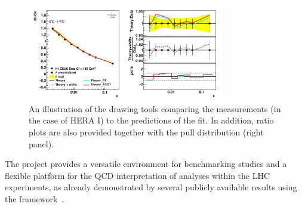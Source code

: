 \begin{description}
\begin{figure}[!ht]
   \centering
   \includegraphics[width=8.6cm]{datatheory.pdf}
   \caption{An illustration of the \fitter drawing tools comparing the measurements (in the case of HERA I) to the predictions of the fit. In addition, ratio plots are also provided together with the pull distribution (right panel).} 
 \label{fig:data}
\end{figure}

\end{description}
%


The \fitter project provides a versatile environment for benchmarking studies 
and a flexible platform for the QCD interpretation of analyses within the LHC experiments,
as already demonstrated by several publicly available results using the \fitter framework~\cite{atlas:strange,atlas:jets,atlas:hm,cms:strange,cms:jets,h1:2012kk,h1zeus:charm}.  

